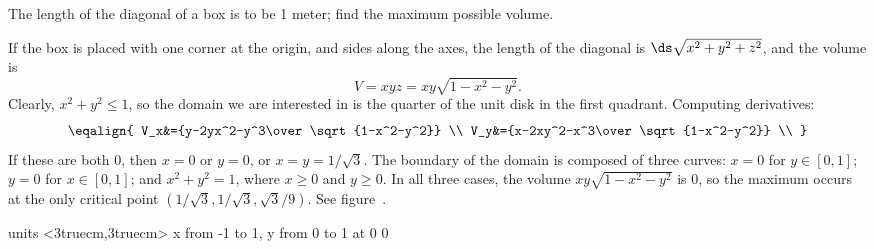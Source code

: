 \begin{example} The length of the diagonal of a box is to be 1 meter; find the
maximum possible volume.
\label{exam:box diagonal}

If the box is placed with one corner at the origin, and sides along
the axes, the length of the diagonal is $\ds\sqrt{x^2+y^2+z^2}$, and
the volume is
$$V=xyz=xy\sqrt{1-x^2-y^2}.$$
Clearly, $x^2+y^2\le 1$, so the domain we are interested in
is the quarter of the unit disk in the first quadrant.
Computing derivatives:
$$\eqalign{
V_x&={y-2yx^2-y^3\over\sqrt{1-x^2-y^2}} \\
V_y&={x-2xy^2-x^3\over\sqrt{1-x^2-y^2}} \\
}$$
If these are both 0, then $x=0$ or $y=0$, or $x=y=1/\sqrt3$. The boundary of
the domain is composed of three curves: $x=0$ for $y\in[0,1]$; $y=0$
for $x\in[0,1]$; and $x^2+y^2=1$, where $x\ge0$ and $y\ge0$. In all
three cases, the volume  $xy\sqrt{1-x^2-y^2}$ is 0, so the maximum
occurs at the only critical point $(1/\sqrt3,1/\sqrt3,\sqrt3/9)$. See
figure~.
\end{example}

\figure
\vbox{\beginpicture
\normalgraphs
\ninepoint
\setcoordinatesystem units <3truecm,3truecm>
\setplotarea x from -1 to 1, y from 0 to 1
 at 0 0
\endpicture}

